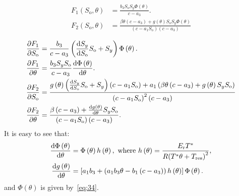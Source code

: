 \documentclass[
    8pt,
    aspectratio=1610,
    c,
    intlimits,
    leqno,
    professionalfonts,
]{beamer}
\begin{document}
\begin{frame}
	\begin{align}
		F_{1}\left(S_{\text{o}},\theta\right) & =
		\frac{
		b_{3}
		S_{\text{o}}
		S_{y}
		\Phi\left(\theta\right)
		}{c-a_{3}}.
		\\
		F_{2}\left(S_{\text{o}},\theta\right) & =
		\frac{
			\beta\theta
			\left(c-a_{3}\right)+
			g\left(\theta\right)
			S_{\text{o}}
			S_{y}
			\Phi\left(\theta\right)}{
			\left(c-a_{1}S_{\text{o}}\right)
			\left(c-a_{3}\right)
		}
	\end{align}

	\begin{align*}
		\diffp{F_{1}}{S_{\text{o}}} & =
		\frac{
		b_{3}
		}{c-a_{3}}
		\left(
		\diff{S_{y}}{S_{\text{o}}}
		S_{\text{o}}+
		S_{y}
		\right)
		\Phi\left(\theta\right)
		.                                       \\
		\diffp{F_{1}}{\theta}       & =
		\frac{b_{3}S_{y}S_{\text{o}}}{c-a_{3}}
		\diff{\Phi\left(\theta\right)}{\theta}. \\
		\diffp{F_{2}}{S_{\text{o}}} & =
		\frac{
			g\left(\theta\right)
			\left(
			\diff{S_{y}}{S_{\text{o}}}
			S_{\text{o}}+
			S_{y}
			\right)
			\left(c-a_{1}S_{\text{o}}\right)+
			a_{1}
			\left(
			\beta\theta
			\left(c-a_{3}\right)+
			g\left(\theta\right)
			S_{y}
			S_{\text{o}}
			\right)
		}{
			{\left(c-a_{1}S_{\text{o}}\right)}^{2}
			\left(c-a_{3}\right)
		}                                       \\
		\diffp{F_{2}}{\theta}       & =
		\frac{
			\beta
			\left(c-a_{3}\right)+
			\diff{g\left(\theta\right)}{\theta}
			S_{y}
			S_{\text{o}}}{
			\left(c-a_{1}S_{\text{o}}\right)
			\left(c-a_{3}\right)
		}.
	\end{align*}
	It is easy to see that:
	\begin{align*}
		\diff{\Phi\left(\theta\right)}{\theta} & =
		\Phi\left(\theta\right)
		h\left(\theta\right),
		\text{ where }
		h\left(\theta\right)=
		\frac{E_{\text{r}}T^{\ast}}{R{\left(T^{\ast}\theta+T_{\text{res}}\right)}^{2}}, \\
		\diff{g\left(\theta\right)}{\theta}    & =
		\left[
		a_{1}b_{3}+
		\left(
		a_{1}b_{3}\theta-
		b_{1}\left(c-a_{3}\right)
		\right)
		h\left(\theta\right)
		\right]
		\Phi\left(\theta\right).
	\end{align*}
	and $\Phi\left(\theta\right)$ is given by~\eqref{eq:34}.
\end{frame}
\end{document}
